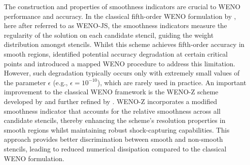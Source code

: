 The construction and properties of smoothness indicators are crucial to WENO performance and accuracy. In the classical fifth-order WENO formulation by \citet{JiangShu1996}, here after referred to as WENO-JS, the smoothness indicators measure the regularity of the solution on each candidate stencil, guiding the weight distribution amongst stencils. Whilst this scheme achieves fifth-order accuracy in smooth regions, \citet{HenrickEtAl2005} identified potential accuracy degradation at certain critical points and introduced a mapped WENO procedure to address this limitation. However, such degradation typically occurs only with extremely small values of the parameter $\epsilon$ (e.g., $\epsilon = 10^{-10}$), which are rarely used in practice. An important improvement to the classical WENO framework is the WENO-Z scheme developed by \citet{BorgesEtAl2008} and further refined by \citet{CastroEtAl2011}. WENO-Z incorporates a modified smoothness indicator that accounts for the relative smoothness across all candidate stencils, thereby enhancing the scheme's resolution properties in smooth regions whilst maintaining robust shock-capturing capabilities. This approach provides better discrimination between smooth and non-smooth stencils, leading to reduced numerical dissipation compared to the classical WENO formulation.

